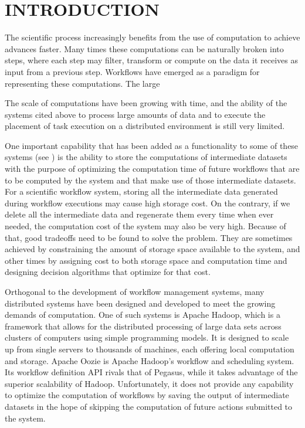 \chapter{INTRODUCTION}
\label{chap:introduction}
The scientific process increasingly benefits from the use of computation to achieve advances faster. Many times these computations can be naturally broken into steps, where each step may filter, transform or compute on the data it receives as input from a previous step.  Workflows have emerged as a paradigm for representing these computations. The large 




The scale of computations have been growing with time, and the ability of the systems cited above to process large amounts of data and to execute the placement of task execution on a distributed environment is still very limited.  

One important capability that has been added as a functionality to some of these systems (see \cite{yuan2012data}) is the ability to store the computations of intermediate datasets with the purpose of optimizing the computation time of future workflows that are to be computed by the system and that make use of those intermediate datasets. For a scientific workflow system, storing all the intermediate data generated during workflow executions may cause high storage cost.  On the contrary, if we delete all the intermediate data and regenerate them every time when ever needed, the computation cost of the system may also be very high. Because of that, good tradeoffs need to be found to solve the problem.  They are sometimes achieved by constraining the amount of storage space available to the system, and other times by assigning cost to both storage space and computation time and designing decision algorithms that optimize for that cost. 

Orthogonal to the development of workflow management systems, many distributed systems have been designed and developed to meet the growing demands of computation.  One of such systems is Apache Hadoop, which is a framework that allows for the distributed processing of large data sets across clusters of computers using simple programming models. It is designed to scale up from single servers to thousands of machines, each offering local computation and storage. Apache Oozie\cite{islam2012oozie} is Apache Hadoop's workflow and scheduling system.  Its workflow definition API rivals that of Pegasus, while it takes advantage of the superior scalability of Hadoop. Unfortunately, it does not provide any capability to optimize the computation of workflows by saving the output of intermediate datasets in the hope of skipping the computation of future actions submitted to the system.


